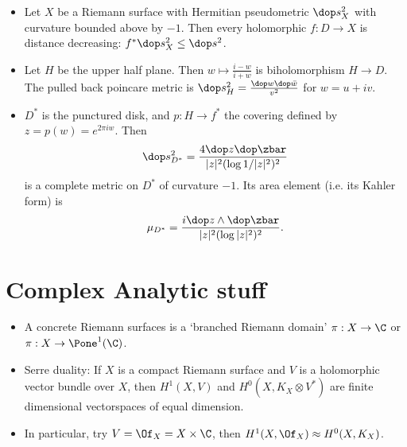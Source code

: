 \documentclass[11pt]{amsart}
\begin{document}
\begin{itemize}
  \item Let $X$ be a Riemann surface with Hermitian pseudometric $\dop s_X^2$ with curvature bounded above by $-1$. Then every holomorphic $f:D\to X$ is distance decreasing: $f^* \dop s_X^2  \leq \dop s^2$. 
  \item Let $H$ be the upper half plane. Then $w\mapsto \frac{i-w}{i+w}$ is biholomorphism $H \to D$. The pulled back poincare metric is $\dop s_H^2 = \frac{\dop w \dop \bar{w}}{v^2}$ for $w=u+iv$. 
  \item $D^*$ is the punctured disk, and $p:H \to f^*$ the covering defined by $z=p(w)=e^{2\pi i w}$. Then \[ \dop s_{D^*}^2 = \frac{4 \dop z \dop \zbar} {|z|^2 ( \log 1/|z|^2)^2} \] is a complete metric on $D^*$  of curvature $-1$. Its area element (i.e. its Kahler form) is  \[ \mu_{D^*} = \frac{i \dop z \wedge \dop \zbar} { |z|^2 (\log |z|^2)^2}.  \]
\end{itemize}

\section{Complex Analytic stuff}
\begin{itemize}
  \item A concrete Riemann surfaces is a `branched Riemann domain' $\pi:X \to \C$ or $\pi: X \to \Pone^1(\C)$.
  \item Serre duality: If $X$ is a compact Riemann surface and $V$ is a holomorphic vector bundle over $X$, then $H^1(X,V)$ and $H^0(X,K_X \otimes V^*)$ are finite dimensional vectorspaces of equal dimension. 
  \item In particular, try $V=\Of_X = X\times \C $, then $H^1(X,\Of_X) \approx H^0(X,K_X)$. 
\end{itemize}
\end{document}
